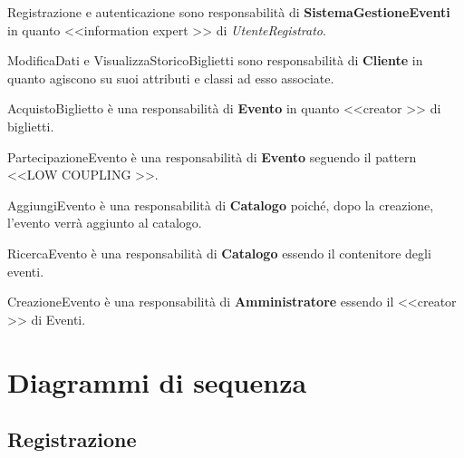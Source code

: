\begin{description}
	\item Registrazione e autenticazione sono responsabilità di \textbf{SistemaGestioneEventi} in quanto \textless\textless information expert \textgreater\textgreater{} di \textit{UtenteRegistrato}.
	
	\item ModificaDati e VisualizzaStoricoBiglietti sono responsabilità di \textbf{Cliente} in quanto agiscono su suoi attributi e classi ad esso associate.
	
	\item AcquistoBiglietto è una responsabilità di \textbf{Evento} in quanto \textless\textless creator \textgreater\textgreater{} di biglietti.
	
	\item PartecipazioneEvento è una responsabilità di \textbf{Evento} seguendo il pattern \textless\textless LOW COUPLING \textgreater\textgreater.
	
	\item AggiungiEvento è una responsabilità di \textbf{Catalogo} poiché, dopo la creazione, l’evento verrà aggiunto al catalogo.
	
	\item RicercaEvento è una responsabilità di \textbf{Catalogo} essendo il contenitore degli eventi.
	
	\item CreazioneEvento è una responsabilità di \textbf{Amministratore} essendo il \textless\textless creator \textgreater\textgreater{} di Eventi.
  \end{description}


\newpage

\section{Diagrammi di sequenza}

\subsection{Registrazione}

